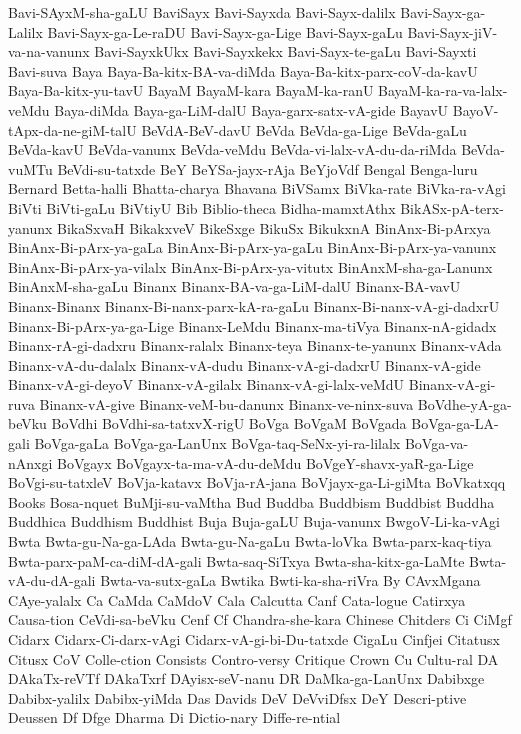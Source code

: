 {Bavi-SAyxM-sha-gaLU
BaviSayx
Bavi-Sayxda
Bavi-Sayx-dalilx
Bavi-Sayx-ga-Lalilx
Bavi-Sayx-ga-Le-raDU
Bavi-Sayx-ga-Lige
Bavi-Sayx-gaLu
Bavi-Sayx-jiV-va-na-vanunx
Bavi-SayxkUkx
Bavi-Sayxkekx
Bavi-Sayx-te-gaLu
Bavi-Sayxti
Bavi-suva
Baya
Baya-Ba-kitx-BA-va-diMda
Baya-Ba-kitx-parx-coV-da-kavU
Baya-Ba-kitx-yu-tavU
BayaM
BayaM-kara
BayaM-ka-ranU
BayaM-ka-ra-va-lalx-veMdu
Baya-diMda
Baya-ga-LiM-dalU
Baya-garx-satx-vA-gide
BayavU
BayoV-tApx-da-ne-giM-talU
BeVdA-BeV-davU
BeVda
BeVda-ga-Lige
BeVda-gaLu
BeVda-kavU
BeVda-vanunx
BeVda-veMdu
BeVda-vi-lalx-vA-du-da-riMda
BeVda-vuMTu
BeVdi-su-tatxde
BeY
BeYSa-jayx-rAja
BeYjoVdf
Bengal
Benga-luru
Bernard
Betta-halli
Bhatta-charya
Bhavana
BiVSamx
BiVka-rate
BiVka-ra-vAgi
BiVti
BiVti-gaLu
BiVtiyU
Bib
Biblio-theca
Bidha-mamxtAthx
BikASx-pA-terx-yanunx
BikaSxvaH
BikakxveV
BikeSxge
BikuSx
BikukxnA
BinAnx-Bi-pArxya
BinAnx-Bi-pArx-ya-gaLa
BinAnx-Bi-pArx-ya-gaLu
BinAnx-Bi-pArx-ya-vanunx
BinAnx-Bi-pArx-ya-vilalx
BinAnx-Bi-pArx-ya-vitutx
BinAnxM-sha-ga-Lanunx
BinAnxM-sha-gaLu
Binanx
Binanx-BA-va-ga-LiM-dalU
Binanx-BA-vavU
Binanx-Binanx
Binanx-Bi-nanx-parx-kA-ra-gaLu
Binanx-Bi-nanx-vA-gi-dadxrU
Binanx-Bi-pArx-ya-ga-Lige
Binanx-LeMdu
Binanx-ma-tiVya
Binanx-nA-gidadx
Binanx-rA-gi-dadxru
Binanx-ralalx
Binanx-teya
Binanx-te-yanunx
Binanx-vAda
Binanx-vA-du-dalalx
Binanx-vA-dudu
Binanx-vA-gi-dadxrU
Binanx-vA-gide
Binanx-vA-gi-deyoV
Binanx-vA-gilalx
Binanx-vA-gi-lalx-veMdU
Binanx-vA-gi-ruva
Binanx-vA-give
Binanx-veM-bu-danunx
Binanx-ve-ninx-suva
BoVdhe-yA-ga-beVku
BoVdhi
BoVdhi-sa-tatxvX-rigU
BoVga
BoVgaM
BoVgada
BoVga-ga-LA-gali
BoVga-gaLa
BoVga-ga-LanUnx
BoVga-taq-SeNx-yi-ra-lilalx
BoVga-va-nAnxgi
BoVgayx
BoVgayx-ta-ma-vA-du-deMdu
BoVgeY-shavx-yaR-ga-Lige
BoVgi-su-tatxleV
BoVja-katavx
BoVja-rA-jana
BoVjayx-ga-Li-giMta
BoVkatxqq
Books
Bosa-nquet
BuMji-su-vaMtha
Bud
Buddba
Buddbism
Buddbist
Buddha
Buddhica
Buddhism
Buddhist
Buja
Buja-gaLU
Buja-vanunx
BwgoV-Li-ka-vAgi
Bwta
Bwta-gu-Na-ga-LAda
Bwta-gu-Na-gaLu
Bwta-loVka
Bwta-parx-kaq-tiya
Bwta-parx-paM-ca-diM-dA-gali
Bwta-saq-SiTxya
Bwta-sha-kitx-ga-LaMte
Bwta-vA-du-dA-gali
Bwta-va-sutx-gaLa
Bwtika
Bwti-ka-sha-riVra
By
CAvxMgana
CAye-yalalx
Ca
CaMda
CaMdoV
Cala
Calcutta
Canf
Cata-logue
Catirxya
Causa-tion
CeVdi-sa-beVku
Cenf
Cf
Chandra-she-kara
Chinese
Chitders
Ci
CiMgf
Cidarx
Cidarx-Ci-darx-vAgi
Cidarx-vA-gi-bi-Du-tatxde
CigaLu
Cinfjei
Citatusx
Citusx
CoV
Colle-ction
Consists
Contro-versy
Critique
Crown
Cu
Cultu-ral
DA
DAkaTx-reVTf
DAkaTxrf
DAyisx-seV-nanu
DR
DaMka-ga-LanUnx
Dabibxge
Dabibx-yalilx
Dabibx-yiMda
Das
Davids
DeV
DeVviDfsx
DeY
Descri-ptive
Deussen
Df
Dfge
Dharma
Di
Dictio-nary
Diffe-re-ntial
}
